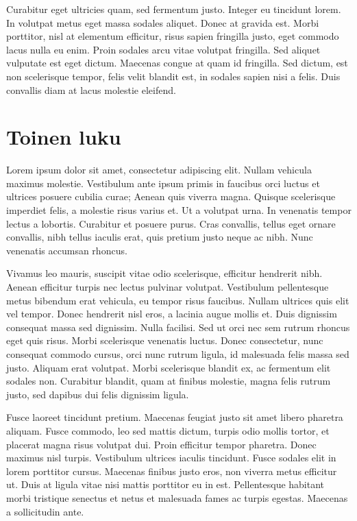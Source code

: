 Curabitur eget ultricies quam, sed fermentum justo. Integer eu tincidunt lorem. In volutpat metus eget massa sodales aliquet. Donec at gravida est. Morbi porttitor, nisl at elementum efficitur, risus sapien fringilla justo, eget commodo lacus nulla eu enim. Proin sodales arcu vitae volutpat fringilla. Sed aliquet vulputate est eget dictum. Maecenas congue at quam id fringilla. Sed dictum, est non scelerisque tempor, felis velit blandit est, in sodales sapien nisi a felis. Duis convallis diam at lacus molestie eleifend. 

\section{Toinen luku}



Lorem ipsum dolor sit amet, consectetur adipiscing elit. Nullam vehicula maximus molestie. Vestibulum ante ipsum primis in faucibus orci luctus et ultrices posuere cubilia curae; Aenean quis viverra magna. Quisque scelerisque imperdiet felis, a molestie risus varius et. Ut a volutpat urna. In venenatis tempor lectus a lobortis. Curabitur et posuere purus. Cras convallis, tellus eget ornare convallis, nibh tellus iaculis erat, quis pretium justo neque ac nibh. Nunc venenatis accumsan rhoncus.

Vivamus leo mauris, suscipit vitae odio scelerisque, efficitur hendrerit nibh. Aenean efficitur turpis nec lectus pulvinar volutpat. Vestibulum pellentesque metus bibendum erat vehicula, eu tempor risus faucibus. Nullam ultrices quis elit vel tempor. Donec hendrerit nisl eros, a lacinia augue mollis et. Duis dignissim consequat massa sed dignissim. Nulla facilisi. Sed ut orci nec sem rutrum rhoncus eget quis risus. Morbi scelerisque venenatis luctus. Donec consectetur, nunc consequat commodo cursus, orci nunc rutrum ligula, id malesuada felis massa sed justo. Aliquam erat volutpat. Morbi scelerisque blandit ex, ac fermentum elit sodales non. Curabitur blandit, quam at finibus molestie, magna felis rutrum justo, sed dapibus dui felis dignissim ligula.

Fusce laoreet tincidunt pretium. Maecenas feugiat justo sit amet libero pharetra aliquam. Fusce commodo, leo sed mattis dictum, turpis odio mollis tortor, et placerat magna risus volutpat dui. Proin efficitur tempor pharetra. Donec maximus nisl turpis. Vestibulum ultrices iaculis tincidunt. Fusce sodales elit in lorem porttitor cursus. Maecenas finibus justo eros, non viverra metus efficitur ut. Duis at ligula vitae nisi mattis porttitor eu in est. Pellentesque habitant morbi tristique senectus et netus et malesuada fames ac turpis egestas. Maecenas a sollicitudin ante.

